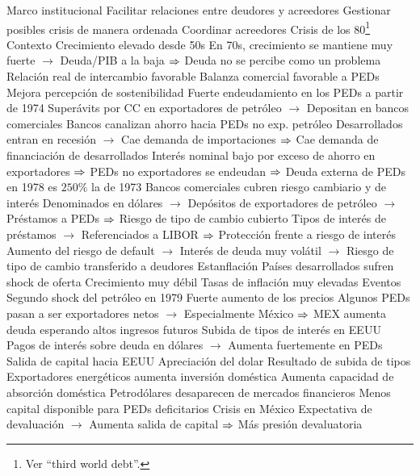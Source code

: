 \documentclass{nuevotema}
\begin{document}
\begin{esquemal}
			\3 Marco institucional
				\4 Facilitar relaciones entre deudores y acreedores
				\4 Gestionar posibles crisis de manera ordenada
				\4 Coordinar acreedores
		\2 Crisis de los 80\footnote{Ver ``third world debt''.}
			\3 Contexto
				\4 Crecimiento elevado desde 50s
				\4[] En 70s, crecimiento se mantiene muy fuerte
				\4[] $\to$ Deuda/PIB a la baja
				\4[] $\Rightarrow$ Deuda no se percibe como un problema
				\4 Relación real de intercambio favorable
				\4[] Balanza comercial favorable a PEDs
				\4[] Mejora percepción de sostenibilidad
				\4 Fuerte endeudamiento en los PEDs a partir de 1974
				\4[] Superávits por CC en exportadores de petróleo
				\4[] $\to$ Depositan en bancos comerciales
				\4[] Bancos canalizan ahorro hacia PEDs no exp. petróleo
				\4[] Desarrollados entran en recesión
				\4[] $\to$ Cae demanda de importaciones
				\4[] $\Rightarrow$ Cae demanda de financiación de desarrollados
				\4[] Interés nominal bajo por exceso de ahorro en exportadores
				\4[] $\Rightarrow$ PEDs no exportadores se endeudan
				\4[] $\Rightarrow$ Deuda externa de PEDs en 1978 es $250\%$ la de 1973
				\4 Bancos comerciales cubren riesgo cambiario y de interés
				\4[] Denominados en dólares
				\4[] $\to$ Depósitos de exportadores de petróleo
				\4[] $\to$ Préstamos a PEDs
				\4[] $\Rightarrow$ Riesgo de tipo de cambio cubierto
				\4[] Tipos de interés de préstamos
				\4[] $\to$ Referenciados a LIBOR
				\4[] $\Rightarrow$ Protección frente a riesgo de interés
				\4[] Aumento del riesgo de default
				\4[] $\to$ Interés de deuda muy volátil
				\4[] $\to$ Riesgo de tipo de cambio transferido a deudores
				\4 Estanflación
				\4[] Países desarrollados sufren shock de oferta
				\4[] Crecimiento muy débil
				\4[] Tasas de inflación muy elevadas
			\3 Eventos
				\4 Segundo shock del petróleo en 1979
				\4[] Fuerte aumento de los precios
				\4[] Algunos PEDs pasan a ser exportadores netos
				\4[] $\to$ Especialmente México
				\4[] $\Rightarrow$ MEX aumenta deuda esperando altos ingresos futuros
				\4 Subida de tipos de interés en EEUU
				\4[] Pagos de interés sobre deuda en dólares
				\4[] $\to$ Aumenta fuertemente en PEDs
				\4[] Salida de capital hacia EEUU
				\4 Apreciación del dolar
				\4[] Resultado de subida de tipos
				\4 Exportadores energéticos aumenta inversión doméstica
				\4[] Aumenta capacidad de absorción doméstica
				\4[] Petrodólares desaparecen de mercados financieros
				\4[] Menos capital disponible para PEDs deficitarios
				\4 Crisis en México
				\4[] Expectativa de devaluación
				\4[] $\to$ Aumenta salida de capital
				\4[] $\Rightarrow$ Más presión devaluatoria

\end{esquemal}
\end{document}
